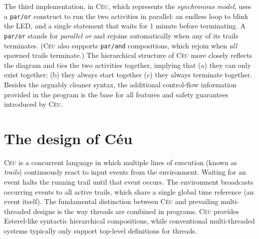 \documentclass[10pt]{sensys-proc}
\newcommand{\CEU}{\textsc{C\'{e}u}\xspace}
\newcommand{\code}[1] {{\small{\texttt{#1}}}}
\begin{document}

The third implementation, in \CEU, which represents the \emph{synchronous 
model}, uses a \code{par/or} construct to run the two activities in parallel:
an endless loop to blink the LED, and a single statement that waits for 1 
minute before terminating.
A \code{par/or} stands for \emph{parallel or} and rejoins automatically when 
any of its trails terminates.
(\CEU also supports \code{par/and} compositions, which rejoin when \emph{all} 
spawned trails terminate.)
%
The hierarchical structure of \CEU more closely reflects the diagram and ties 
the two activities together, implying that
(a) they can only exist together;
(b) they always start together
(c) they always terminate together.
%
Besides the arguably cleaner syntax, the additional control-flow information 
provided in the program is the base for all features and safety guarantees 
introduced by \CEU.


\section{The design of C\'eu}
\label{sec.ceu}

\CEU{} is a concurrent language in which multiple lines of execution (known as 
\emph{trails}) continuously react to input events from the environment.
Waiting for an event halts the running trail until that event occurs.
The environment broadcasts occurring events to all active trails, which share a 
single global time reference (an event itself).
%
%
The fundamental distinction between \CEU and prevailing multi-threaded designs 
is the way threads are combined in programs.
\CEU provides Esterel-like syntactic hierarchical compositions, while 
conventional multi-threaded systems typically only support top-level 
definitions for threads.
\end{document}

